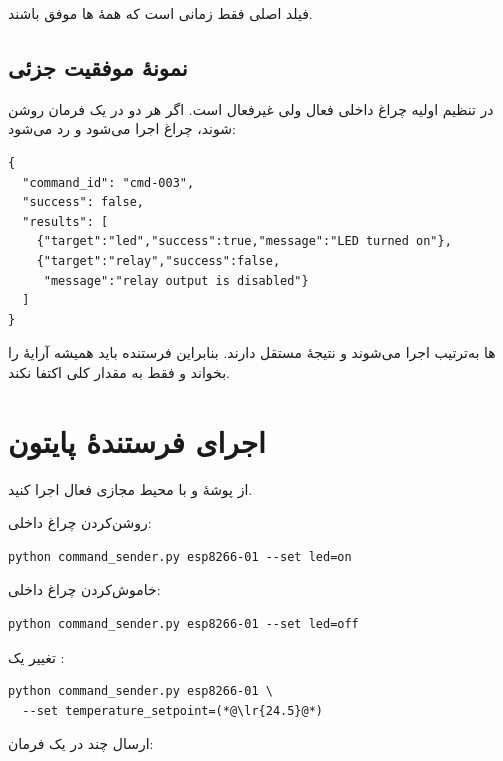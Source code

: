فیلد اصلی
فقط زمانی
است که همهٔ
ها
موفق باشند.

\subsection{نمونهٔ موفقیت جزئی}
در تنظیم اولیه چراغ داخلی فعال ولی
غیرفعال است. اگر هر دو در یک فرمان روشن شوند، چراغ اجرا می‌شود و
رد می‌شود:

\begin{LTR}
\begin{lstlisting}
{
  "command_id": "cmd-003",
  "success": false,
  "results": [
    {"target":"led","success":true,"message":"LED turned on"},
    {"target":"relay","success":false,
     "message":"relay output is disabled"}
  ]
}
\end{lstlisting}
\end{LTR}

ها
به‌ترتیب اجرا می‌شوند و نتیجهٔ مستقل دارند. بنابراین فرستنده باید همیشه آرایهٔ
را بخواند و فقط به مقدار کلی اکتفا نکند.

\section{اجرای فرستندهٔ پایتون}
از پوشهٔ
و با محیط مجازی فعال اجرا کنید.

روشن‌کردن چراغ داخلی:

\begin{LTR}
\begin{lstlisting}
python command_sender.py esp8266-01 --set led=on
\end{lstlisting}
\end{LTR}

خاموش‌کردن چراغ داخلی:

\begin{LTR}
\begin{lstlisting}
python command_sender.py esp8266-01 --set led=off
\end{lstlisting}
\end{LTR}

تغییر یک
:

\begin{LTR}
\begin{lstlisting}
python command_sender.py esp8266-01 \
  --set temperature_setpoint=(*@\lr{24.5}@*)
\end{lstlisting}
\end{LTR}

ارسال چند
در یک فرمان:

